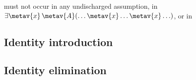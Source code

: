 \begin{multicols}{2}
\begin{fitchproof}
	\open	
		\AS
	\close
\end{fitchproof}

\medskip\begin{raggedright}
\noindent {} must not occur in any undischarged assumption, in $\exists \metav{x}\,\metav{A}(\ldots \metav{x} \ldots \metav{x}\ldots)$, or in \end{raggedright}\vfill\columnbreak

\end{multicols}

\subsection*{Identity introduction}

\begin{fitchproof}
	 
\end{fitchproof}


\subsection*{Identity elimination}

\begin{multicols}{2}
\begin{fitchproof}
	 
\end{fitchproof}
\begin{fitchproof}
	 
\end{fitchproof}
\end{multicols}


